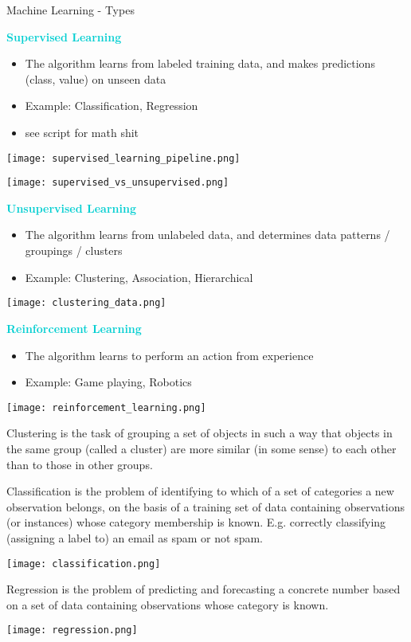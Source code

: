 \begin{concept}{Machine Learning - Types}

    \textcolor{darkturquoise}{\textbf{Supervised Learning}}
    \begin{itemize}
        \item The algorithm learns from labeled training data, and makes predictions (class, value) on unseen data
        \item Example: Classification, Regression
        \item see script for math shit
    \end{itemize}

    \texttt{[image: supervised\_learning\_pipeline.png]}

    \texttt{[image: supervised\_vs\_unsupervised.png]}

    \textcolor{darkturquoise}{\textbf{Unsupervised Learning}}
    \begin{itemize}
        \item The algorithm learns from unlabeled data, and determines data patterns / groupings / clusters
        \item Example: Clustering, Association, Hierarchical
    \end{itemize}

    \texttt{[image: clustering\_data.png]}

    \textcolor{darkturquoise}{\textbf{Reinforcement Learning}}
    \begin{itemize}
        \item The algorithm learns to perform an action from experience
        \item Example: Game playing, Robotics
    \end{itemize}

    \texttt{[image: reinforcement\_learning.png]}
\end{concept}

\begin{definition}{Clustering}
    is the task of grouping a set of objects in such a way that objects in the same group (called a cluster) are more similar (in some sense) to each other than to
    those in other groups.
\end{definition}

\begin{definition}{Classification}
    is the problem of identifying to which of a set of categories a new observation belongs, on the basis of a training set of data containing observations (or instances) whose category membership is known. 
    E.g. correctly classifying (assigning a label to) an email as spam or not spam.

    \texttt{[image: classification.png]}
\end{definition}

\begin{definition}{Regression}
    is the problem of predicting and forecasting a concrete number based on a set of data containing observations whose category is known.

    \texttt{[image: regression.png]}
\end{definition}



